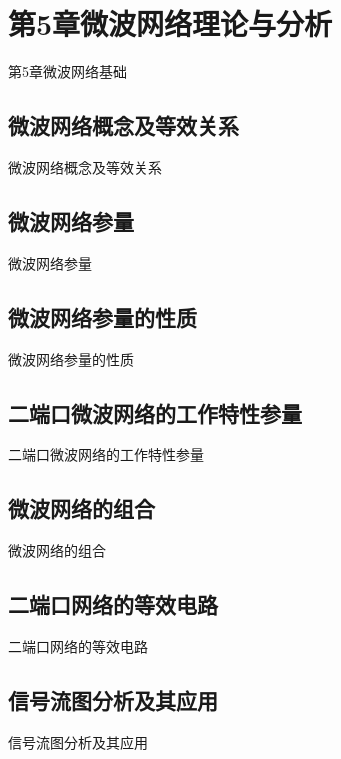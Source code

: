 \section{第5章\quad 微波网络理论与分析}
\begin{frame}{第5章\quad 微波网络基础}

\end{frame}

\subsection{微波网络概念及等效关系}
\begin{frame}{微波网络概念及等效关系}

\end{frame}

\subsection{微波网络参量}
\begin{frame}{微波网络参量}

\end{frame}

\subsection{微波网络参量的性质}
\begin{frame}{微波网络参量的性质}

\end{frame}

\subsection{二端口微波网络的工作特性参量}
\begin{frame}{二端口微波网络的工作特性参量}

\end{frame}

\subsection{微波网络的组合}
\begin{frame}{微波网络的组合}

\end{frame}

\subsection{二端口网络的等效电路}
\begin{frame}{二端口网络的等效电路}

\end{frame}

\subsection{信号流图分析及其应用}
\begin{frame}{信号流图分析及其应用}

\end{frame}

